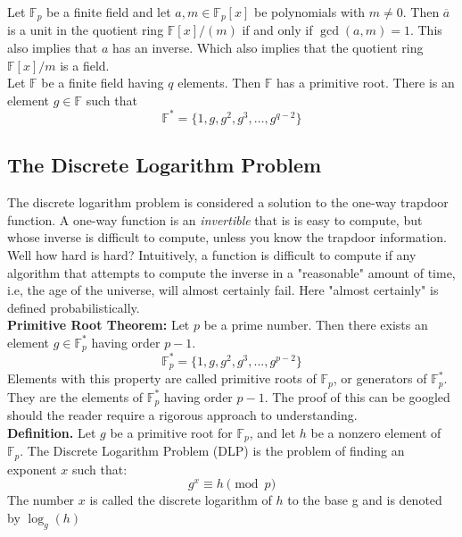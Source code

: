 \documentclass{article}
\begin{document}
\noindent Let $\mathbb{F}_p$ be a finite field and let $a,m \in \mathbb{F}_p[x]$ be polynomials with $m \neq 0$. Then $\overline{a}$ is a unit in the quotient ring $\mathbb{F}[x]/(m)$ if and only if $\gcd(a,m) = 1$. This also implies that $a$ has an inverse. Which also implies that the quotient ring $\mathbb{F}[x]/m$ is a field. \\

\noindent Let $\mathbb{F}$ be a finite field having $q$ elements. Then $\mathbb{F}$ has a primitive root. There is an element $g \in \mathbb{F}$ such that 
\begin{equation}
    \mathbb{F}^* = \{1, g, g^2, g^3, \dots, g^{q-2}\}
\end{equation}


\subsection{The Discrete Logarithm Problem}
The discrete logarithm problem is considered a solution to the one-way trapdoor function. A one-way function is an \textit{invertible} that is is easy to compute, but whose inverse is difficult to compute, unless you know the trapdoor information. Well how hard is hard? Intuitively, a function is difficult to compute if any algorithm that attempts to compute the inverse in a "reasonable" amount of time, i.e, the age of the universe, will almost certainly fail. Here "almost certainly" is defined probabilistically. \\

\noindent \textbf{Primitive Root Theorem:} Let $p$ be a prime number. Then there exists an element $g \in \mathbb{F}^*_p$ having order $p-1$.
\begin{equation}
    \mathbb{F}_p^* = \{1,g,g^2,g^3,...,g^{p-2}\}
\end{equation}
Elements with this property are called primitive roots of $\mathbb{F}_p$, or generators of $\mathbb{F}_p^*$. They are the elements of $\mathbb{F}_p^*$ having order $p-1$. The proof of this can be googled should the reader require a rigorous approach to understanding. \\

\noindent \textbf{Definition.} Let $g$ be a primitive root for $\mathbb{F}_p$, and let $h$ be a nonzero element of $\mathbb{F}_p$. The Discrete Logarithm Problem (DLP) is the problem of finding an exponent $x$ such that:
\begin{equation}
    g^x \equiv h \pmod p
\end{equation}
The number $x$ is called the discrete logarithm of $h$ to the base g and is denoted by $\log_g(h)$ \\
\end{document}
